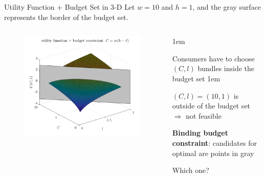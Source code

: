 \documentclass[11pt,aspectratio=43]{beamer}
\let\olditemize=\itemize
\let\endolditemize=\enditemize
\renewenvironment{itemize}{\olditemize \itemsep1em}{\endolditemize}
\theoremstyle{definition}
\begin{document}
\begin{frame}{Utility Function + Budget Set in 3-D}
\label{slide:Utility_Function___Budget_Set_in_3_D}
    Let $ w = 10 $ and $ h = 1 $, and the gray surface represents the \alert{border} of the budget set.
    \begin{columns}
        \begin{column}{0.6\textwidth}
            \begin{figure}
                \includegraphics[width=\textwidth]{./figures/UtilityBudget.png}
            \end{figure}
        \end{column}
        \begin{column}{0.4\textwidth}
            \begin{itemize}
                \item Consumers have to choose $ ( C, l ) $ bundles \alert{inside the budget set}
                \begin{itemize}
                    \item $ ( C, l ) = ( 10, 1 ) $ is \alert{outside} of the budget set $ \Rightarrow  $ not feasible
                \end{itemize}
                \item \textbf{Binding budget constraint}: candidates for optimal are points in gray
                \item Which one?
            \end{itemize}
        \end{column}
    \end{columns}
\end{frame}
\end{document}
